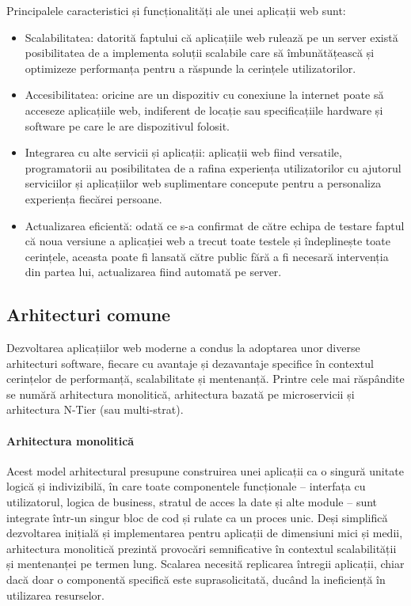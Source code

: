 \documentclass[12pt, a4paper, oneside, romanian]{teza-upb}
\begin{document}
	Principalele caracteristici și funcționalități ale unei aplicații web sunt:
	\begin{itemize}
		\item Scalabilitatea: datorită faptului că aplicațiile web rulează pe un server există posibilitatea de a implementa soluții scalabile care să îmbunătățească și optimizeze performanța pentru a răspunde la cerințele utilizatorilor.
		\item Accesibilitatea: oricine are un dispozitiv cu conexiune la internet poate să acceseze aplicațiile web, indiferent de locație sau specificațiile hardware și software pe care le are dispozitivul folosit.
		\item Integrarea cu alte servicii și aplicații: aplicații web fiind versatile, programatorii au posibilitatea de a rafina experiența utilizatorilor cu ajutorul serviciilor și aplicațiilor web suplimentare concepute pentru a personaliza experiența fiecărei persoane.
		\item Actualizarea eficientă: odată ce s-a confirmat de către echipa de testare faptul că noua versiune a aplicației web a trecut toate testele și îndeplinește toate cerințele, aceasta poate fi lansată către public fără a fi necesară intervenția din partea lui, actualizarea fiind automată pe server.
	\end{itemize}
	
	
	
	\subsection{Arhitecturi comune}
	Dezvoltarea aplicațiilor web moderne a condus la adoptarea unor diverse arhitecturi software, fiecare cu avantaje și dezavantaje specifice în contextul cerințelor de performanță, scalabilitate și mentenanță. Printre cele mai răspândite se numără arhitectura monolitică, arhitectura bazată pe microservicii și arhitectura N-Tier (sau multi-strat).
	
	\paragraph{Arhitectura monolitică}
	Acest model arhitectural \cite{mono} presupune construirea unei aplicații ca o singură unitate logică și indivizibilă, în care toate componentele funcționale – interfața cu utilizatorul, logica de business, stratul de acces la date și alte module – sunt integrate într-un singur bloc de cod și rulate ca un proces unic. Deși simplifică dezvoltarea inițială și implementarea pentru aplicații de dimensiuni mici și medii, arhitectura monolitică prezintă provocări semnificative în contextul scalabilității și mentenanței pe termen lung. Scalarea necesită replicarea întregii aplicații, chiar dacă doar o componentă specifică este suprasolicitată, ducând la ineficiență în utilizarea resurselor.
	
\end{document}
